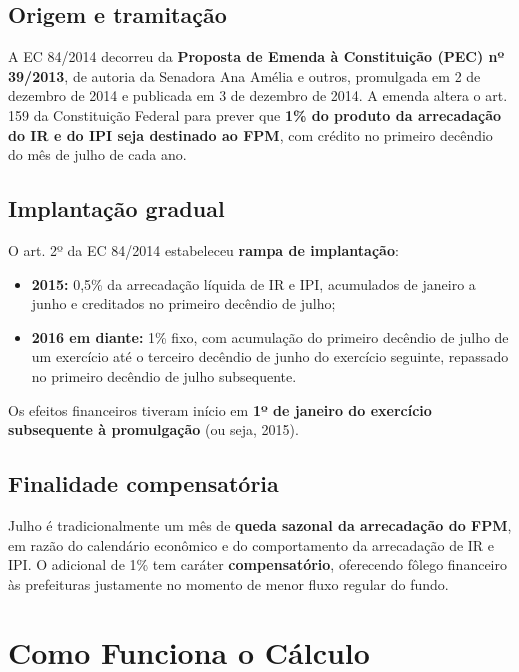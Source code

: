 \documentclass[12pt,a4paper]{article}
\begin{document}
\subsection{Origem e tramitação}

A EC 84/2014 decorreu da \textbf{Proposta de Emenda à Constituição (PEC) nº 39/2013}, de autoria da Senadora Ana Amélia e outros, promulgada em 2 de dezembro de 2014 e publicada em 3 de dezembro de 2014. A emenda altera o art. 159 da Constituição Federal para prever que \textbf{1\% do produto da arrecadação do IR e do IPI seja destinado ao FPM}, com crédito no primeiro decêndio do mês de julho de cada ano.

\subsection{Implantação gradual}

O art. 2º da EC 84/2014 estabeleceu \textbf{rampa de implantação}:

\begin{itemize}[leftmargin=2.5em]
  \item \textbf{2015:} 0,5\% da arrecadação líquida de IR e IPI, acumulados de janeiro a junho e creditados no primeiro decêndio de julho;
  \item \textbf{2016 em diante:} 1\% fixo, com acumulação do primeiro decêndio de julho de um exercício até o terceiro decêndio de junho do exercício seguinte, repassado no primeiro decêndio de julho subsequente.
\end{itemize}

Os efeitos financeiros tiveram início em \textbf{1º de janeiro do exercício subsequente à promulgação} (ou seja, 2015).

\subsection{Finalidade compensatória}

Julho é tradicionalmente um mês de \textbf{queda sazonal da arrecadação do FPM}, em razão do calendário econômico e do comportamento da arrecadação de IR e IPI. O adicional de 1\% tem caráter \textbf{compensatório}, oferecendo fôlego financeiro às prefeituras justamente no momento de menor fluxo regular do fundo.

\section{Como Funciona o Cálculo}
\end{document}
